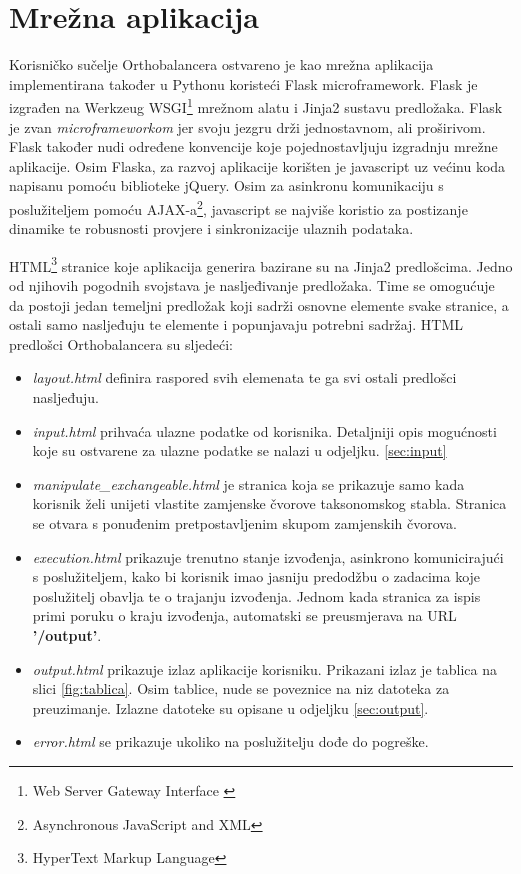 \chapter{Mrežna aplikacija}
\label{chap:server}

Korisničko sučelje Orthobalancera ostvareno je kao mrežna aplikacija
implementirana također u Pythonu koristeći Flask microframework. Flask je
izgrađen na Werkzeug WSGI\footnote{Web Server Gateway Interface \cite{pep333}}
mrežnom alatu i Jinja2 sustavu predložaka. Flask je zvan \emph{microframeworkom}
jer svoju jezgru drži jednostavnom, ali proširivom. Flask također nudi određene
konvencije koje pojednostavljuju izgradnju mrežne aplikacije. Osim Flaska, za
razvoj aplikacije korišten je javascript uz većinu koda napisanu pomoću
biblioteke jQuery. Osim za asinkronu komunikaciju s poslužiteljem pomoću
AJAX-a\footnote{Asynchronous JavaScript and XML}, javascript se najviše koristio
za postizanje dinamike te robusnosti provjere i sinkronizacije ulaznih podataka.

HTML\footnote{HyperText Markup Language} stranice koje aplikacija generira
bazirane su na Jinja2 predlošcima. Jedno od njihovih pogodnih svojstava je
nasljeđivanje predložaka. Time se omogućuje da postoji jedan temeljni predložak
koji sadrži osnovne elemente svake stranice, a ostali samo nasljeđuju te
elemente i popunjavaju potrebni sadržaj. HTML predlošci Orthobalancera su
sljedeći:

\begin{itemize}

    \item \emph{layout.html} definira raspored svih elemenata te ga svi ostali
predlošci nasljeđuju.

    \item \emph{input.html} prihvaća ulazne podatke od korisnika. Detaljniji
opis mogućnosti koje su ostvarene za ulazne podatke se nalazi u odjeljku.
\ref{sec:input}

    \item \emph{manipulate\_exchangeable.html} je stranica koja se prikazuje
samo kada korisnik želi unijeti vlastite zamjenske čvorove taksonomskog stabla.
Stranica se otvara s ponuđenim pretpostavljenim skupom zamjenskih čvorova.

    \item \emph{execution.html}  prikazuje trenutno stanje izvođenja, asinkrono
komunicirajući s poslužiteljem, kako bi korisnik imao jasniju predodžbu o
zadacima koje poslužitelj obavlja te o trajanju izvođenja. Jednom kada stranica
za ispis primi poruku o kraju izvođenja, automatski se preusmjerava na URL
\textbf{'/output'}.

    \item \emph{output.html} prikazuje izlaz aplikacije korisniku. Prikazani
izlaz je tablica na slici \ref{fig:tablica}. Osim tablice, nude se poveznice na
niz datoteka za preuzimanje. Izlazne datoteke su opisane u odjeljku
\ref{sec:output}.

    \item \emph{error.html} se prikazuje ukoliko na poslužitelju dođe do
pogreške.

\end{itemize}

